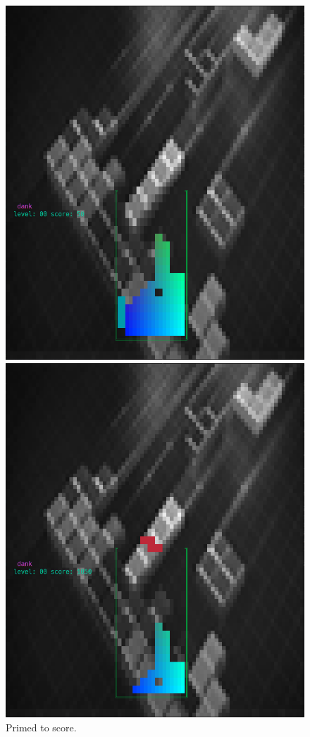 \begin{figure}
  \centering
  \begin{minipage}{0.45\textwidth}
    \includegraphics[width=1\linewidth]{media/tetris-prescore.png}
    \caption{Primed to score.}
  \end{minipage}\hfill
  \begin{minipage}{0.45\textwidth}
    \includegraphics[width=1\linewidth]{media/tetris-postscore.png}

\end{minipage}
\end{figure}
